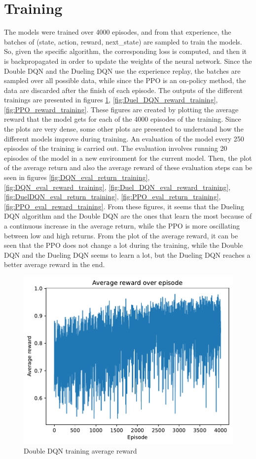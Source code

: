 \documentclass{article}
\begin{document}
\section{Training}\label{section:Training}
The models were trained over 4000 episodes, and from that experience, the batches of (state, action, reward, next\_state) are sampled to train the models. So, given the specific algorithm, the corresponding loss is computed, and then it is backpropagated in order to update the weights of the neural network.
Since the Double DQN and the Dueling DQN use the experience replay, the batches are sampled over all possible data, while since the PPO is an on-policy method, the data are discarded after the finish of each episode.
The outputs of the different trainings are presented in figures \ref{fig:DQN_reward_training}, \ref{fig:Duel_DQN_reward_training}, \ref{fig:PPO_reward_training}. These figures are created by plotting the average reward that the model gets for each of the 4000 episodes of the training.
Since the plots are very dense, some other plots are presented to understand how the different models improve during training. An evaluation of the model every 250 episodes of the training is carried out. The evaluation involves running 20 episodes of the model in a new environment for the current model. Then, the plot of the average return and also the average reward of these evaluation steps can be seen in figures \ref{fig:DQN_eval_return_training}, \ref{fig:DQN_eval_reward_training}, \ref{fig:Duel_DQN_eval_reward_training}, \ref{fig:DuelDQN_eval_return_training}, \ref{fig:PPO_eval_return_training}, \ref{fig:PPO_eval_reward_training}.
From these figures, it seems that the Dueling DQN algorithm and the Double DQN are the ones that learn the most because of a continuous increase in the average return, while the PPO is more oscillating between low and high returns. From the plot of the average reward, it can be seen that the PPO does not change a lot during the training, while the Double DQN and the Dueling DQN seems to learn a lot, but the Dueling DQN reaches a better average reward in the end.

\begin{figure}
    \centering
    \includegraphics[width=0.7\linewidth]{img/DQN_training.pdf}
    \caption{Double DQN training average reward}
    \label{fig:DQN_reward_training}
\end{figure}
\end{document}
